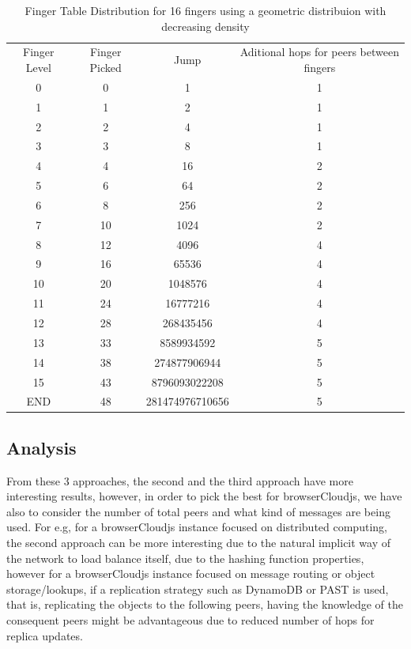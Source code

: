\begin{table}
    \centering
    \begin{tabular}{| c | c | c | c |}
    \hline
        Finger Level &  Finger Picked & Jump & Aditional hops for peers between fingers \\
        0 & 0 & 1 & 1 \\
        1 & 1 & 2 & 1 \\
        2 & 2 & 4 & 1 \\
        3 & 3 & 8 & 1 \\
        4 & 4 & 16 & 2 \\
        5 & 6 & 64 & 2 \\
        6 & 8 & 256 & 2 \\
        7 & 10 & 1024 & 2 \\
        8 & 12 & 4096 & 4 \\
        9 & 16 & 65536 & 4 \\
        10 & 20 & 1048576 & 4 \\
        11 & 24 & 16777216 & 4 \\
        12 & 28 & 268435456 & 4 \\
        13 & 33 & 8589934592 & 5 \\
        14 & 38 & 274877906944 & 5 \\
        15 & 43 & 8796093022208 & 5 \\
        END & 48 & 281474976710656 & 5 \\
    \hline
    \end{tabular}
    \caption{Finger Table Distribution for 16 fingers using a geometric distribuion with decreasing density}
    \label{tbl:table-c}
\end{table}

\subsection{Analysis}

From these 3 approaches, the second and the third approach have more interesting results, however, in order to pick the best for browserCloudjs, we have also to consider the number of total peers and what kind of messages are being used. For e.g, for a browserCloudjs instance focused on distributed computing, the second approach can be more interesting due to the natural implicit way of the network to load balance itself, due to the hashing function properties, however for a browserCloudjs instance focused on message routing or object storage/lookups, if a replication strategy such as DynamoDB or PAST is used, that is, replicating the objects to the following peers, having the knowledge of the consequent peers might be advantageous due to reduced number of hops for replica updates.

